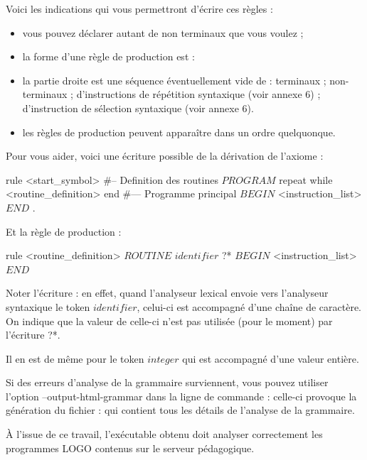 Voici les indications qui vous permettront d'écrire ces règles :
\begin{itemize}
  \item vous pouvez déclarer autant de non terminaux que vous voulez ;
  \item la forme d'une règle de production est :
  \item la partie droite est une séquence éventuellement vide de :
	terminaux ;
	non-terminaux ;
	d'instructions de répétition syntaxique (voir annexe 6) ;
	d'instruction de sélection syntaxique (voir annexe 6).
  \item les règles de production peuvent apparaître dans un ordre quelquonque.
\end{itemize}

Pour vous aider, voici une écriture possible de la dérivation de l'axiome :

\begin{galgascode}
rule <start_symbol> {
#-- Definition des routines
  $PROGRAM$
  repeat
  while
    <routine_definition>
  end
#--- Programme principal
  $BEGIN$
  <instruction_list> 
  $END$
  $.$
}
\end{galgascode}

Et la règle de production  :

\begin{galgascode}
rule <routine_definition> {
  $ROUTINE$
  $identifier$ ?*
  $BEGIN$
  <instruction_list>
  $END$
}
\end{galgascode}

Noter l’écriture  : en effet, quand l’analyseur lexical envoie vers l’analyseur syntaxique le token $identifier$, celui-ci est accompagné d’une chaîne de caractère. On indique que la valeur de celle-ci n’est pas utilisée (pour le moment) par l’écriture ?*.

Il en est de même pour le token $integer$ qui est accompagné d’une valeur entière.

Si des erreurs d'analyse de la grammaire surviennent, vous pouvez utiliser l'option --output-html-grammar dans la ligne de commande : celle-ci provoque la génération du fichier :
qui contient tous les détails de l'analyse de la grammaire.

À l'issue de ce travail, l'exécutable obtenu doit analyser correctement les programmes LOGO contenus sur le serveur pédagogique.

